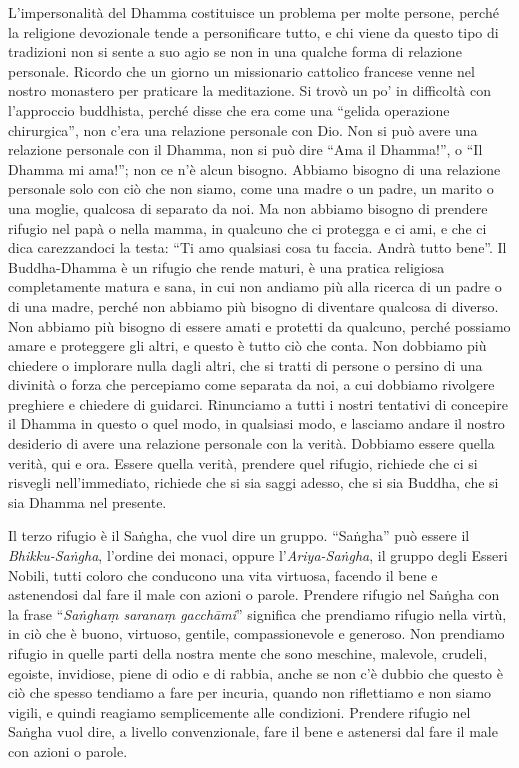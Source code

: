 L'impersonalità del Dhamma costituisce un problema per molte persone,
perché la religione devozionale tende a personificare tutto, e chi viene
da questo tipo di tradizioni non si sente a suo agio se non in una
qualche forma di relazione personale. Ricordo che un giorno un
missionario cattolico francese venne nel nostro monastero per praticare
la meditazione. Si trovò un po' in difficoltà con l'approccio buddhista,
perché disse che era come una ``gelida operazione chirurgica'', non
c'era una relazione personale con Dio. Non si può avere una relazione
personale con il Dhamma, non si può dire ``Ama il Dhamma!'', o ``Il
Dhamma mi ama!''; non ce n'è alcun bisogno. Abbiamo bisogno di una
relazione personale solo con ciò che non siamo, come una madre o un
padre, un marito o una moglie, qualcosa di separato da noi. Ma non
abbiamo bisogno di prendere rifugio nel papà o nella mamma, in qualcuno
che ci protegga e ci ami, e che ci dica carezzandoci la testa: ``Ti amo
qualsiasi cosa tu faccia. Andrà tutto bene''. Il Buddha-Dhamma è un
rifugio che rende maturi, è una pratica religiosa completamente matura e
sana, in cui non andiamo più alla ricerca di un padre o di una madre,
perché non abbiamo più bisogno di diventare qualcosa di diverso. Non
abbiamo più bisogno di essere amati e protetti da qualcuno, perché
possiamo amare e proteggere gli altri, e questo è tutto ciò che conta.
Non dobbiamo più chiedere o implorare nulla dagli altri, che si tratti
di persone o persino di una divinità o forza che percepiamo come
separata da noi, a cui dobbiamo rivolgere preghiere e chiedere di
guidarci. Rinunciamo a tutti i nostri tentativi di concepire il Dhamma
in questo o quel modo, in qualsiasi modo, e lasciamo andare il nostro
desiderio di avere una relazione personale con la verità. Dobbiamo
essere quella verità, qui e ora. Essere quella verità, prendere quel
rifugio, richiede che ci si risvegli nell'immediato, richiede che si sia
saggi adesso, che si sia Buddha, che si sia Dhamma nel presente.

Il terzo rifugio è il Saṅgha, che vuol dire un gruppo. ``Saṅgha'' può
essere il \emph{Bhikku-Saṅgha}, l'ordine dei monaci, oppure
l'\emph{Ariya-Saṅgha}, il gruppo degli Esseri Nobili, tutti
coloro che conducono una vita virtuosa, facendo il bene e astenendosi
dal fare il male con azioni o parole. Prendere rifugio nel Saṅgha con la
frase ``\emph{Saṅghaṃ saranaṃ gacchāmi}'' significa che prendiamo
rifugio nella virtù, in ciò che è buono, virtuoso, gentile,
compassionevole e generoso. Non prendiamo rifugio in quelle parti della
nostra mente che sono meschine, malevole, crudeli, egoiste, invidiose,
piene di odio e di rabbia, anche se non c'è dubbio che questo è ciò che
spesso tendiamo a fare per incuria, quando non riflettiamo e non siamo
vigili, e quindi reagiamo semplicemente alle condizioni. Prendere
rifugio nel Saṅgha vuol dire, a livello convenzionale, fare il bene e
astenersi dal fare il male con azioni o parole.


